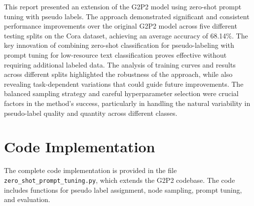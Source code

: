 \documentclass[10pt,conference]{IEEEtran}
\begin{document}
This report presented an extension of the G2P2 model using zero-shot prompt tuning with pseudo labels. The approach demonstrated significant and consistent performance improvements over the original G2P2 model across five different testing splits on the Cora dataset, achieving an average accuracy of 68.14\%. The key innovation of combining zero-shot classification for pseudo-labeling with prompt tuning for low-resource text classification proves effective without requiring additional labeled data. The analysis of training curves and results across different splits highlighted the robustness of the approach, while also revealing task-dependent variations that could guide future improvements. The balanced sampling strategy and careful hyperparameter selection were crucial factors in the method's success, particularly in handling the natural variability in pseudo-label quality and quantity across different classes.

\appendix
\section{Code Implementation}
The complete code implementation is provided in the file \texttt{zero\_shot\_prompt\_tuning.py}, which extends the G2P2 codebase. The code includes functions for pseudo label assignment, node sampling, prompt tuning, and evaluation.
\end{document}

